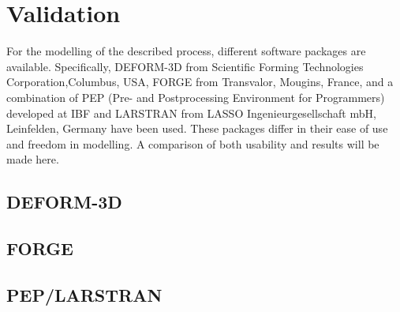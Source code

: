 \section{Validation}

For the modelling of the described process, different software packages are available. Specifically, DEFORM-3D from Scientific Forming Technologies Corporation,Columbus, USA, FORGE from Transvalor, Mougins, France, and a combination of PEP (Pre- and Postprocessing Environment for Programmers) developed at IBF and LARSTRAN from LASSO Ingenieurgesellschaft mbH, Leinfelden, Germany have been used. These packages differ in their ease of use and freedom in modelling. A comparison of both usability and results will be made here.

\subsection{DEFORM-3D}

\subsection{FORGE}

\subsection{PEP/LARSTRAN}
